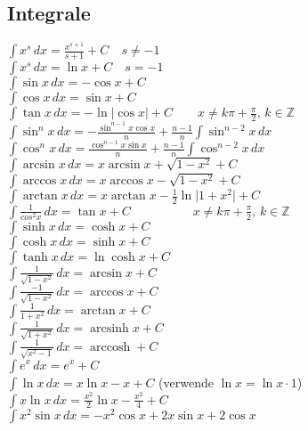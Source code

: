 \documentclass[landscape, 10pt]{article}
\newcommand{\Z}{\mathbb{Z}}
\begin{document}
\begin{multicols}{3}
\subsection{Integrale}
$\int x^s\,dx=\frac{x^{s+1}}{s+1}+C\quad s\neq-1$\\
$\int x^s\,dx=\ln x+C\quad s=-1$\\
$\int\sin x\,dx=-\cos x+C$\\
$\int\cos x\,dx=\sin x+C$\\
$\int\tan x\,dx=-\ln|\cos x|+C\qquad 
       x\neq k\pi+\frac{\pi}{2},\,k\in\Z$\\
$\int \sin^n x \, dx 
       = - \frac{\sin^{n-1} {x} \cos {x}}{n} 
       + \frac{n-1}{n} 
       \int \sin^{n-2}{x} \, dx$\\
$\int \cos^n x \, dx
       = \frac{\cos^{n-1} {x} \sin {x}}{n} 
       + \frac{n-1}{n} 
       \int \cos^{n-2}{x} \, dx$\\
$\int \arcsin{x} \, dx 
       = x \arcsin{x} + \sqrt{1 - x^2} + C$\\
$\int \arccos{x} \, dx 
       = x \arccos{x} - \sqrt{1 - x^2} + C$\\
$\int \arctan{x} \, dx 
       = x \arctan{x} 
       - \frac{1}{2} 
       \ln { \vert 1 + x^2 \vert } + C$\\
$\int\frac{1}{cos^2x}\,dx=\tan x+C\qquad\qquad\quad
       x\neq k\pi+\frac{\pi}{2},\,k\in\Z$\\
$\int\sinh x\,dx=\cosh x+C$\\
$\int\cosh x\,dx=\sinh x+C$\\
$\int \tanh x \, dx = \ln \cosh x + C$\\
$\int\frac{1}{\sqrt{1-x^2}}\,dx=\arcsin x+C$\\
$\int\frac{-1}{\sqrt{1-x^2}}\,dx=\arccos x+C$\\
$\int\frac{1}{1+x^2}\,dx=\arctan x+C$\\
$\int\frac{1}{\sqrt{1+x^2}}\,dx=\operatorname{arcsinh} x+C$\\
$\int\frac{1}{\sqrt{x^2-1}}\,dx=\operatorname{arccosh}+C$\\
$\int e^x\,dx=e^x+C$\\
$\int\ln x\,dx=x\ln x-x+C$ (verwende $\ln x=\ln x\cdot1$)\\
$\int x\ln x\,dx=\frac{x^2}{2}\ln x-\frac{x^2}{4}+C$\\
$\int x^2\sin x\,dx=-x^2\cos x+2x\sin x+2\cos x$\\

\end{multicols}
\end{document}

